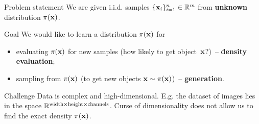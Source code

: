 \begin{frame}{Problem statement}
	We are given i.i.d. samples $\{\mathbf{x}_i\}_{i=1}^n \in \mathbb{R}^m$ from \textbf{unknown} distribution $\pi(\mathbf{x})$.
	
	\begin{block}{Goal}
		We would like to learn a distribution $\pi(\mathbf{x})$ for 
		\begin{itemize}
		    \item evaluating $\pi(\mathbf{x})$ for new samples (how likely to get object~$\mathbf{x}$?)~-- \textbf{density evaluation};
		    \item sampling from $\pi(\mathbf{x})$ (to get new objects $\mathbf{x} \sim \pi(\mathbf{x})$)~-- \textbf{generation}.
		\end{itemize}
	\end{block}
	\begin{block}{Challenge}
		 Data is complex and high-dimensional. E.g. the dataset of images lies in the space $\mathbb{R}^{\text{width} \times \text{height} \times \text{channels}}$. Curse of dimensionality does not allow us to find the exact density $\pi(\mathbf{x})$. 
	\end{block}
\end{frame}
